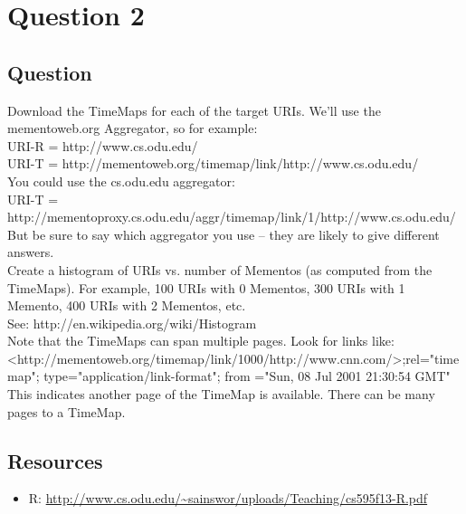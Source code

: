 \section{Question 2}

\subsection{Question}
Download the TimeMaps for each of the target URIs.  We'll use the mementoweb.org 
Aggregator, so for example:\\

URI-R = http://www.cs.odu.edu/\\

URI-T = http://mementoweb.org/timemap/link/http://www.cs.odu.edu/\\

You could use the cs.odu.edu aggregator:\\

URI-T = http://mementoproxy.cs.odu.edu/aggr/timemap/link/1/http://www.cs.odu.edu/\\

But be sure to say which aggregator you use -- they are likely to give
different answers.\\

Create a histogram of URIs vs. number of Mementos (as computed from
the TimeMaps).  For example, 100 URIs with 0 Mementos, 300 URIs
with 1 Memento, 400 URIs with 2 Mementos, etc.\\

See: http://en.wikipedia.org/wiki/Histogram\\

Note that the TimeMaps can span multiple pages.  Look for links like:\\

<http://mementoweb.org/timemap/link/1000/http://www.cnn.com/>;rel="timemap"; 
type="application/link-format"; from ="Sun, 08 Jul 2001 21:30:54 GMT"\\

This indicates another page of the TimeMap is available.  There can be 
many pages to a TimeMap.\\

\subsection{Resources}
\begin{itemize}
\item R: \url{http://www.cs.odu.edu/~sainswor/uploads/Teaching/cs595f13-R.pdf}
\end{itemize}

